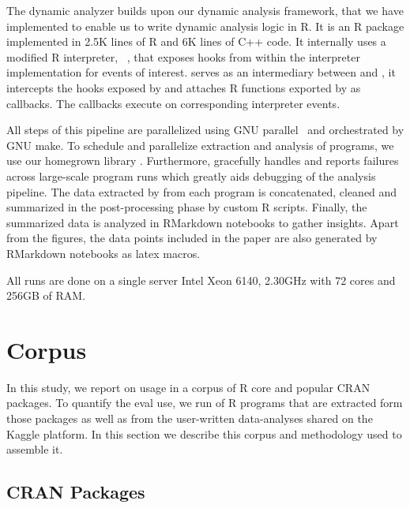 \documentclass[conference]{IEEEtran}
\begin{document}
The dynamic analyzer builds upon our dynamic analysis framework, \instrumentr
that we have implemented to enable us to write dynamic analysis logic in R. It
is an R package implemented in 2.5K lines of R and 6K lines of C++ code. It
internally uses a modified R interpreter, \rdyntrace~\cite{oopsla19a}, that
exposes hooks from within the interpreter implementation for events of interest.
\instrumentr serves as an intermediary between \rdyntrace and \evil, it
intercepts the hooks exposed by \rdyntrace and attaches R functions exported by
\evil as callbacks. The \evil callbacks execute on corresponding interpreter
events.

All steps of this pipeline are parallelized using GNU
parallel~\cite{GNUparallel} and orchestrated by GNU make. To schedule and
parallelize extraction and analysis of programs, we use our homegrown library
\runr. Furthermore, \runr gracefully handles and reports failures across
large-scale program runs which greatly aids debugging of the analysis pipeline.
The data extracted by \evil from each program is concatenated, cleaned and
summarized in the post-processing phase by custom R scripts. Finally, the
summarized data is analyzed in RMarkdown notebooks to gather insights. Apart
from the figures, the data points included in the paper are also generated by
RMarkdown notebooks as latex macros.

All runs are done on a single server Intel Xeon 6140, 2.30GHz with 72 cores and
256GB of RAM.

\section{Corpus}

In this study, we report on \eval usage in a corpus of \CorpusCorePackages R core
and \CorpusPackages popular CRAN packages. To quantify the eval use, we run
\CorpusAllProgramsRnd of R programs that are extracted form those packages as
well as from the user-written data-analyses shared on the Kaggle platform. In
this section we describe this corpus and methodology used to assemble it.

\subsection{CRAN Packages}
\end{document}
